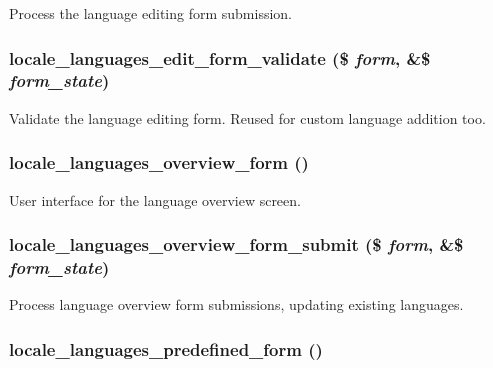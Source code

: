 Process the language editing form submission. \hypertarget{group__locale_g0d97a3815fcd49bb49ed59dc77ebb802}{
\subsubsection[{locale\_\-languages\_\-edit\_\-form\_\-validate}]{\setlength{\rightskip}{0pt plus 5cm}locale\_\-languages\_\-edit\_\-form\_\-validate (\$ {\em form}, \/  \&\$ {\em form\_\-state})}}
\label{group__locale_g0d97a3815fcd49bb49ed59dc77ebb802}


Validate the language editing form. Reused for custom language addition too. \hypertarget{group__locale_g6cdda3c5c776e4c263ace510317cdeed}{
\subsubsection[{locale\_\-languages\_\-overview\_\-form}]{\setlength{\rightskip}{0pt plus 5cm}locale\_\-languages\_\-overview\_\-form ()}}
\label{group__locale_g6cdda3c5c776e4c263ace510317cdeed}


User interface for the language overview screen. \hypertarget{group__locale_g957be3bb6cd02af2ff2acd887fc2b3fe}{
\subsubsection[{locale\_\-languages\_\-overview\_\-form\_\-submit}]{\setlength{\rightskip}{0pt plus 5cm}locale\_\-languages\_\-overview\_\-form\_\-submit (\$ {\em form}, \/  \&\$ {\em form\_\-state})}}
\label{group__locale_g957be3bb6cd02af2ff2acd887fc2b3fe}


Process language overview form submissions, updating existing languages. \hypertarget{group__locale_ga8a3a758f48d2d2e1e7746dbb6ece613}{
\subsubsection[{locale\_\-languages\_\-predefined\_\-form}]{\setlength{\rightskip}{0pt plus 5cm}locale\_\-languages\_\-predefined\_\-form ()}}
\label{group__locale_ga8a3a758f48d2d2e1e7746dbb6ece613}


